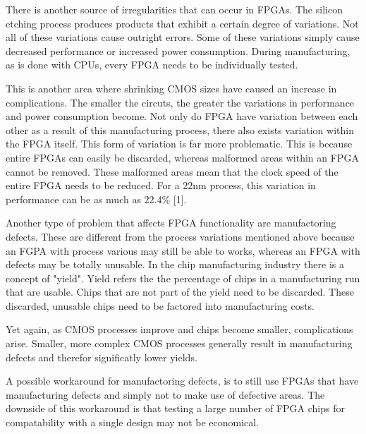 \documentclass{article}
\begin{document}
    There is another source of irregularities that can occur in FPGAs. The silicon etching
    process produces products that exhibit a certain degree of variations.
    Not all of these variations cause outright errors. Some of these variations simply
    cause decreased performance or increased power consumption. During manufacturing,
    as is done with CPUs, every FPGA needs to be individually tested.

    This is another area where shrinking CMOS sizes have caused an increase in complications.
    The smaller the circuts, the greater the variations in performance and power consumption
    become.
    Not only do FPGA have variation between each other as a result of this manufacturing process,
    there also exists variation within the FPGA itself. This form of variation
    is far more problematic. This is because entire FPGAs can easily be discarded,
    whereas malformed areas within an FPGA cannot be removed. These malformed areas
    mean that the clock speed of the entire FPGA needs to be reduced. For
    a 22nm process, this variation in performance can be as much as 22.4\% [1].

    Another type of problem that affects FPGA functionality are manufactoring defects.
    These are different from the process variations mentioned above because an FGPA
    with process various may still be able to works, whereas an FPGA with defects
    may be totally unusable. In the chip manufacturing industry there is a concept of
    "yield". Yield refers the the percentage of chips in a manufacturing run that
    are usable. Chips that are not part of the yield need to be discarded. These
    discarded, unusable chips need to be factored into manufacturing costs.

    Yet again, as CMOS processes improve and chips become smaller, complications arise.
    Smaller, more complex CMOS processes generally result in manufacturing defects and therefor
    significatly lower yields.

    A possible workaround for manufactoring defects, is to still use FPGAs that have manufacturing
    defects and simply not to make use of defective areas.
    The downside of this workaround is that testing a large number of FPGA chips for compatability
    with a single design may not be economical.
\end{document}

